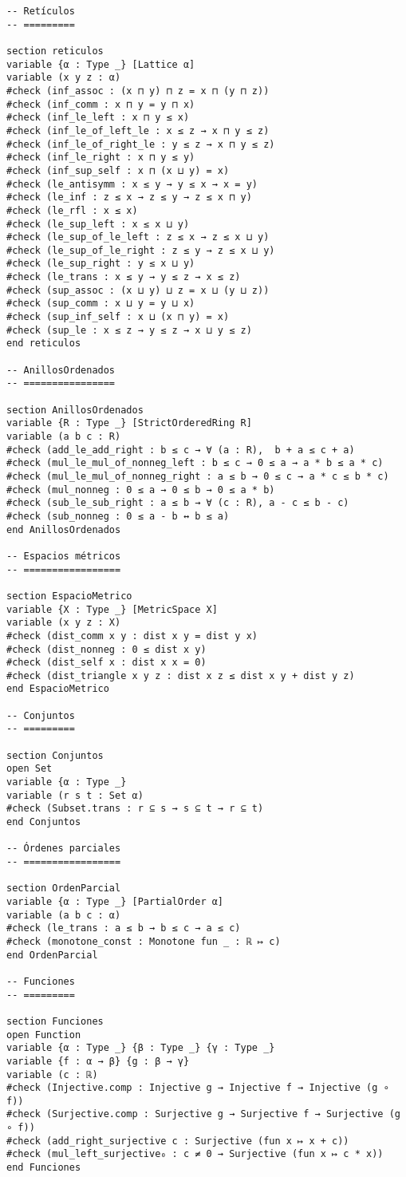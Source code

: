\begin{verbatim}
-- Retículos
-- =========

section reticulos
variable {α : Type _} [Lattice α]
variable (x y z : α)
#check (inf_assoc : (x ⊓ y) ⊓ z = x ⊓ (y ⊓ z))
#check (inf_comm : x ⊓ y = y ⊓ x)
#check (inf_le_left : x ⊓ y ≤ x)
#check (inf_le_of_left_le : x ≤ z → x ⊓ y ≤ z)
#check (inf_le_of_right_le : y ≤ z → x ⊓ y ≤ z)
#check (inf_le_right : x ⊓ y ≤ y)
#check (inf_sup_self : x ⊓ (x ⊔ y) = x)
#check (le_antisymm : x ≤ y → y ≤ x → x = y)
#check (le_inf : z ≤ x → z ≤ y → z ≤ x ⊓ y)
#check (le_rfl : x ≤ x)
#check (le_sup_left : x ≤ x ⊔ y)
#check (le_sup_of_le_left : z ≤ x → z ≤ x ⊔ y)
#check (le_sup_of_le_right : z ≤ y → z ≤ x ⊔ y)
#check (le_sup_right : y ≤ x ⊔ y)
#check (le_trans : x ≤ y → y ≤ z → x ≤ z)
#check (sup_assoc : (x ⊔ y) ⊔ z = x ⊔ (y ⊔ z))
#check (sup_comm : x ⊔ y = y ⊔ x)
#check (sup_inf_self : x ⊔ (x ⊓ y) = x)
#check (sup_le : x ≤ z → y ≤ z → x ⊔ y ≤ z)
end reticulos

-- AnillosOrdenados
-- ================

section AnillosOrdenados
variable {R : Type _} [StrictOrderedRing R]
variable (a b c : R)
#check (add_le_add_right : b ≤ c → ∀ (a : R),  b + a ≤ c + a)
#check (mul_le_mul_of_nonneg_left : b ≤ c → 0 ≤ a → a * b ≤ a * c)
#check (mul_le_mul_of_nonneg_right : a ≤ b → 0 ≤ c → a * c ≤ b * c)
#check (mul_nonneg : 0 ≤ a → 0 ≤ b → 0 ≤ a * b)
#check (sub_le_sub_right : a ≤ b → ∀ (c : R), a - c ≤ b - c)
#check (sub_nonneg : 0 ≤ a - b ↔ b ≤ a)
end AnillosOrdenados

-- Espacios métricos
-- =================

section EspacioMetrico
variable {X : Type _} [MetricSpace X]
variable (x y z : X)
#check (dist_comm x y : dist x y = dist y x)
#check (dist_nonneg : 0 ≤ dist x y)
#check (dist_self x : dist x x = 0)
#check (dist_triangle x y z : dist x z ≤ dist x y + dist y z)
end EspacioMetrico

-- Conjuntos
-- =========

section Conjuntos
open Set
variable {α : Type _}
variable (r s t : Set α)
#check (Subset.trans : r ⊆ s → s ⊆ t → r ⊆ t)
end Conjuntos

-- Órdenes parciales
-- =================

section OrdenParcial
variable {α : Type _} [PartialOrder α]
variable (a b c : α)
#check (le_trans : a ≤ b → b ≤ c → a ≤ c)
#check (monotone_const : Monotone fun _ : ℝ ↦ c)
end OrdenParcial

-- Funciones
-- =========

section Funciones
open Function
variable {α : Type _} {β : Type _} {γ : Type _}
variable {f : α → β} {g : β → γ}
variable (c : ℝ)
#check (Injective.comp : Injective g → Injective f → Injective (g ∘ f))
#check (Surjective.comp : Surjective g → Surjective f → Surjective (g ∘ f))
#check (add_right_surjective c : Surjective (fun x ↦ x + c))
#check (mul_left_surjective₀ : c ≠ 0 → Surjective (fun x ↦ c * x))
end Funciones


\end{verbatim}
